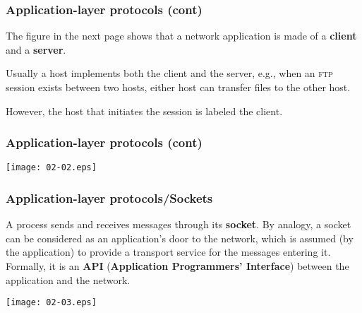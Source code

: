 %
\begin{frame}
\frametitle{Application-layer protocols (cont)}

The figure in the next page shows that a network application is
made of a \textbf{client} and a \textbf{server}.

\bigskip

Usually a host implements both the client and the server, e.g.,  when
an \textsc{ftp} session exists between two hosts, either host can
transfer files to the other host.

\bigskip

However, the host that initiates the session is labeled the client.

\end{frame}


%
\begin{frame}
\frametitle{Application-layer protocols (cont)}

\begin{center}
  \texttt{[image: 02-02.eps]}
\end{center}

\end{frame}

%
\begin{frame}
\frametitle{Application-layer protocols/Sockets}

A process sends and receives messages through its \textbf{socket}. By
analogy, a socket can be considered as an application's door to the
network, which is assumed (by the application) to provide a transport
service for the messages entering it. Formally, it is an \textbf{API}
(\textbf{Application Programmers' Interface}) between the application
and the network.

\hfill\texttt{[image: 02-03.eps]}

\end{frame}


